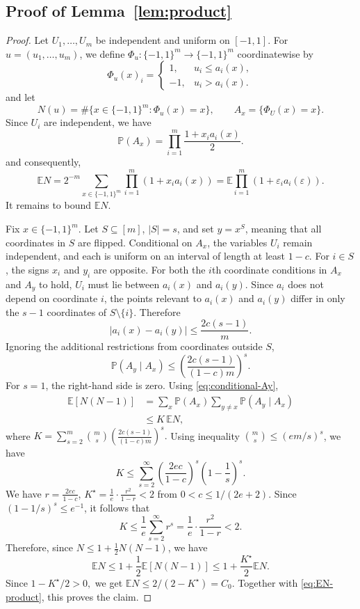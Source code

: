 \documentclass[11pt]{article}
\newcommand{\E}{\mathbb{E}}
\newcommand{\Pp}{\mathbb{P}}
\newcommand{\abs}[1]{\left\lvert #1\right\rvert}
\begin{document}
\subsection{Proof of Lemma~\ref{lem:product}} 
\begin{proof}
Let $U_1,\ldots,U_m$ be independent and uniform on $[-1,1]$. For $u=(u_1,\ldots,u_m)$, we define $\Phi_u:\{-1,1\}^m\to\{-1,1\}^m$ coordinatewise by
\[
\Phi_u(x)_i =
\begin{cases}
1,&u_i\le a_i(x),\\
-1,&u_i>a_i(x).
\end{cases}
\]
and let
\[
N(u) = \#\{x\in\{-1,1\}^m:\Phi_u(x)=x\}, \qquad A_x = \{\Phi_U(x)=x\}.
\]
Since $U_i$ are independent, we have 
\[
\Pp(A_x) = \prod_{i=1}^m \frac{1+x_i a_i(x)}{2}.
\]
and consequently,
\begin{equation}\label{eq:EN-product}
\E N = 2^{-m} \sum_{x\in\{-1,1\}^m} \prod_{i=1}^m (1+x_i a_i(x)) = \E \prod_{i=1}^m (1+\varepsilon_i a_i(\varepsilon)).
\end{equation} 
It remains to bound $\E N$.

Fix $x\in\{-1,1\}^m$. Let $S\subseteq[m]$, $\abs S=s$, and set $y=x^S$, meaning that all coordinates in $S$ are flipped. Conditional on $A_x$, the variables $U_i$ remain independent, and each is uniform on an interval of length at least $1-c$. For $i\in S$, the signs $x_i$ and $y_i$ are opposite. For both the $i$th coordinate conditions in $A_x$ and $A_y$ to hold, $U_i$ must lie between $a_i(x)$ and $a_i(y)$. Since $a_i$ does not depend on coordinate $i$, the points relevant to $a_i(x)$ and $a_i(y)$ differ in only the $s-1$ coordinates of $S\setminus\{i\}$. Therefore
\[
\abs{a_i(x)-a_i(y)}
\le
\frac{2c(s-1)}{m}.
\]
Ignoring the additional restrictions from coordinates outside $S$,
\begin{equation}\label{eq:conditional-Ay}
\Pp(A_y\mid A_x) \le \left( \frac{2c(s-1)}{(1-c)m} \right)^s.
\end{equation}
For $s=1$, the right-hand side is zero. Using \eqref{eq:conditional-Ay},
\begin{align*}
\E[N(N-1)]
&= \sum_x \Pp(A_x) \sum_{y\neq x} \Pp(A_y\mid A_x) \\
&\le K\,\E N,
\end{align*}
where
$K = \sum_{s=2}^m\binom{m}{s} \left( \frac{2c(s-1)}
{(1-c)m} \right)^s.$
Using inequality $\binom{m}{s}\le(em/s)^s$, we have
\[
K \le \sum_{s=2}^{\infty} \left( \frac{2ec}{1-c}\right)^s \left(1-\frac1s\right)^s.
\]
We have $r = \frac{2ec}{1-c} $, $ K^\star = \frac{1}{e}\cdot\frac{r^2}{1-r} < 2$ from $0 < c \le 1/(2e+2)$. Since $(1-1/s)^s\le e^{-1}$, it follows that 
\[
K \le \frac1e \sum_{s=2}^{\infty}r^s = \frac1e \cdot\frac{r^2}{1-r} < 2.
\]
Therefore, since $N \le 1 + \frac12N(N-1)$, we have 
\[ \E N \le 1+\frac12\E[N(N-1)] \le 1+\frac {K^\star}{2}\E N. \]
Since $1-K^\star/2 > 0,$ we get $\E N\le 2/(2-K^\star) = C_0$. Together with \eqref{eq:EN-product}, this proves the claim. 
\end{proof}
\end{document}
